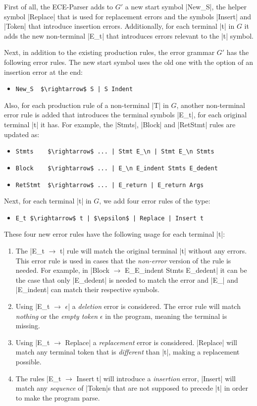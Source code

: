 First of all, the ECE-Parser adds to $G'$ a new start symbol |New_S|, the helper
symbol |Replace| that is used for replacement errors and the symbols |Insert|
and |Token| that introduce insertion errors. Additionally, for each terminal |t|
in $G$ it adds the new non-terminal |E_t| that introduces errors relevant to the
|t| symbol.

Next, in addition to the existing production rules, the error grammar $G'$ has
the following error rules. The new start symbol uses the old one with the option
of an insertion error at the end:
\begin{itemize}
  \item \lstinline{New_S  $\rightarrow$ S | S Indent}
\end{itemize}
Also, for each production rule of a non-terminal |T| in $G$, another
non-terminal error rule is added that introduces the terminal symbols |E_t|, for
each original terminal |t| it has. For example, the |Stmts|, |Block| and
|RetStmt| rules are updated as:
\begin{itemize}
  \item \lstinline{Stmts    $\rightarrow$ ... | Stmt E_\n | Stmt E_\n Stmts}
  \item \lstinline{Block    $\rightarrow$ ... | E_\n E_indent Stmts E_dedent}
  \item \lstinline{RetStmt  $\rightarrow$ ... | E_return | E_return Args}
\end{itemize}
Next, for each terminal |t| in $G$, we add four error rules of the type:
\begin{itemize}
  \item \lstinline{E_t $\rightarrow$ t | $\epsilon$ | Replace | Insert t}
\end{itemize}
These four new error rules have the following usage for each terminal |t|:
\begin{enumerate}
  \item The |E_t $\rightarrow$ t| rule will match the original terminal |t| without any
  errors. This error rule is used in cases that the \emph{non-error} version of
  the rule is needed. For example, in \break
  |Block $\rightarrow$ E_\n E_indent Stmts E_dedent| it can be the case that only
  |E_dedent| is needed to match the error and |E_\n| and |E_indent| can match
  their respective symbols.
  \item Using |E_t $\rightarrow$ $\epsilon$| a \emph{deletion} error is considered. The
  error rule will match \emph{nothing} or the \emph{empty token} $\epsilon$ in
  the program, meaning the terminal is missing.
  \item Using |E_t $\rightarrow$ Replace| a \emph{replacement} error is considered.
  |Replace| will match any terminal token that is \emph{different} than |t|,
  making a replacement possible.
  \item  The rules |E_t $\rightarrow$ Insert t| will introduce a \emph{insertion} error,
  \ie |Insert| will match any \emph{sequence} of |Token|s that are not supposed
  to precede |t| in order to make the program parse.
\end{enumerate}
